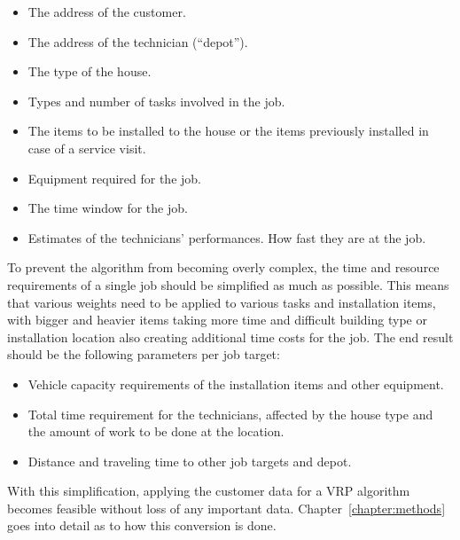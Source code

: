 \begin{itemize}
\item The address of the customer.
\item The address of the technician (``depot'').
\item The type of the house.
\item Types and number of tasks involved in the job.
\item The items to be installed to the house or the items previously installed in case of a service visit.
\item Equipment required for the job.
\item The time window for the job.
\item Estimates of the technicians' performances. How fast they are at the job.
\end{itemize}

To prevent the algorithm from becoming overly complex, the time and resource requirements of a single job should be simplified as much as possible. This means that various weights need to be applied to various tasks and installation items, with bigger and heavier items taking more time and difficult building type or installation location also creating additional time costs for the job. The end result should be the following parameters per job target:

\begin{itemize}
\item Vehicle capacity requirements of the installation items and other equipment.
\item Total time requirement for the technicians, affected by the house type and the amount of work to be done at the location.
\item Distance and traveling time to other job targets and depot. 
\end{itemize}

With this simplification, applying the customer data for a VRP algorithm becomes feasible without loss of any important data. Chapter~\ref{chapter:methods} goes into detail as to how this conversion is done.

